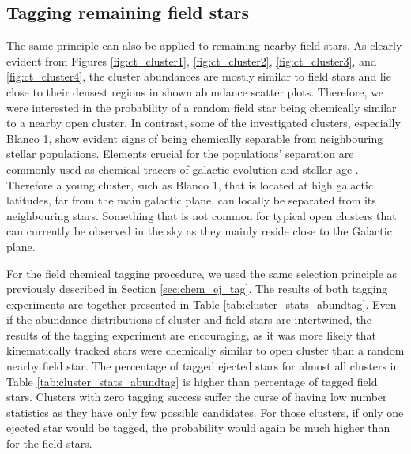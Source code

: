 \subsection{Tagging remaining field stars}
\label{sec:chem_fi_tag}
The same principle can also be applied to remaining nearby field stars. As clearly evident from Figures \ref{fig:ct_cluster1}, \ref{fig:ct_cluster2}, \ref{fig:ct_cluster3}, and \ref{fig:ct_cluster4}, the cluster abundances are mostly similar to field stars and lie close to their densest regions in shown abundance scatter plots. Therefore, we were interested in the probability of a random field star being chemically similar to a nearby open cluster. In contrast, some of the investigated clusters, especially Blanco 1, show evident signs of being chemically separable from neighbouring stellar populations. Elements crucial for the populations' separation are commonly used as chemical tracers of galactic evolution and stellar age \cite{2003A&A...410..527B, 2018MNRAS.474.2580S, 2020MNRAS.491.2043L}. Therefore a young cluster, such as Blanco 1, that is located at high galactic latitudes, far from the main galactic plane, can locally be separated from its neighbouring stars. Something that is not common for typical open clusters that can currently be observed in the sky as they mainly reside close to the Galactic plane.

For the field chemical tagging procedure, we used the same selection principle as previously described in Section \ref{sec:chem_ej_tag}. The results of both tagging experiments are together presented in Table \ref{tab:cluster_stats_abundtag}. Even if the abundance distributions of cluster and field stars are intertwined, the results of the tagging experiment are encouraging, as it was more likely that kinematically tracked stars were chemically similar to open cluster than a random nearby field star. The percentage of tagged ejected stars for almost all clusters in Table \ref{tab:cluster_stats_abundtag} is higher than percentage of tagged  field stars. Clusters with zero tagging success suffer the curse of having low number statistics as they have only few possible candidates. For those clusters, if only one ejected star would be tagged, the probability would again be much higher than for the field stars. 

